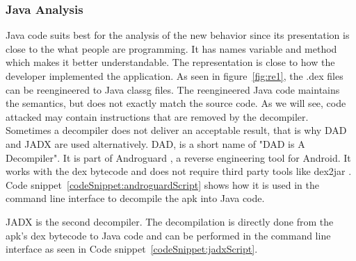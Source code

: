 \subsubsection{Java Analysis} \label{subsection:forensics-tools-java}
Java code suits best for the analysis of the new behavior since its presentation is close to the what people are programming.
It has names variable and method which makes it better understandable.
The representation is close to how the developer implemented the application.
\newline
As seen in figure~\ref{fig:re1}, the .dex files can be reengineered to Java \gls{classg} files.
The reengineered Java code maintains the semantics, but does not exactly match the source code.
As we will see, code attacked may contain instructions that are removed by the decompiler.
Sometimes a decompiler does not deliver an acceptable result, that is why DAD and JADX are used alternatively.
\newline
DAD, is a short name of "DAD is A Decompiler".
It is part of Androguard \cite{androguard}, a reverse engineering tool for Android.
It works with the dex bytecode and does not require third party tools like dex2jar \cite{dex2jar}.
Code snippet~\ref{codeSnippet:androguardScript} shows how it is used in the command line interface to decompile the \gls{apk} into Java code.
\newline

JADX \cite{jadx} is the second decompiler.
The decompilation is directly done from the \gls{apk}'s dex bytecode to Java code and can be performed in the command line interface as seen in Code snippet~\ref{codeSnippet:jadxScript}.


